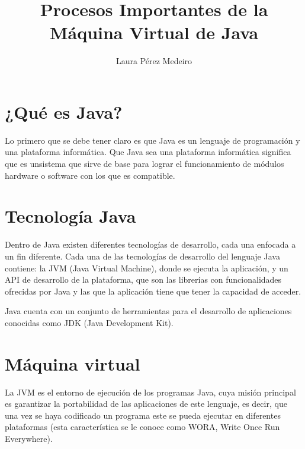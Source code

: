 \documentclass[english,runningheads,a4paper]{llncs}[2018/03/10]
\begin{document}
\title{Procesos Importantes de la Máquina Virtual de Java}

\author{Laura Pérez Medeiro}

\maketitle


\section{¿Qué es Java?}
Lo primero que se debe tener claro es que Java es un lenguaje de programación y una plataforma informática. Que Java sea una plataforma informática significa que es unsistema que sirve de base para lograr el funcionamiento de módulos hardware o software con los que es compatible.
\section{Tecnología Java}
Dentro de Java existen diferentes tecnologías de desarrollo, cada una enfocada a un fin diferente. Cada  una de las tecnologías de desarrollo del lenguaje Java contiene: la JVM (Java Virtual Machine), donde se ejecuta la aplicación,  y un API de desarrollo de la plataforma, que son las librerías con funcionalidades ofrecidas por Java y las que la aplicación tiene que tener la capacidad de acceder.

Java cuenta con un conjunto de herramientas para el desarrollo de aplicaciones conocidas como JDK (Java Development Kit).

\section{Máquina virtual}
La JVM es el entorno de ejecución de los programas Java, cuya misión principal es garantizar la portabilidad de las aplicaciones de este lenguaje, es decir, que una vez se haya codificado un programa este se pueda ejecutar en diferentes plataformas (esta característica se le conoce como WORA, Write Once Run Everywhere).
\end{document}
